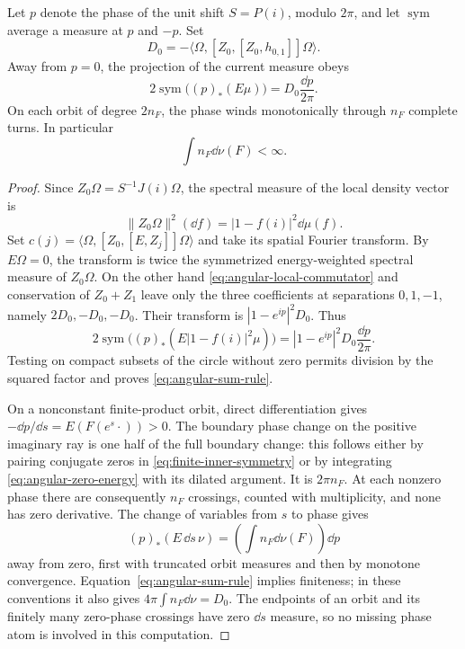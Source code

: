 \begin{lemma}\label{lem:sum-rule}
Let $p$ denote the phase of the unit shift $S=P(i)$, modulo $2\pi$, and
let $\operatorname{sym}$ average a measure at $p$ and $-p$.  Set
\[
 D_0=-\langle\Omega,[Z_0,[Z_0,h_{0,1}]]\Omega\rangle.
\]
Away from $p=0$, the projection of the current measure obeys
\begin{equation}\label{eq:angular-sum-rule}
 2\operatorname{sym}\bigl((p)_*(E\mu)\bigr)
       =D_0\frac{\dd p}{2\pi}.
\end{equation}
On each orbit of degree $2n_F$, the phase winds monotonically through
$n_F$ complete turns.  In particular
\begin{equation}\label{eq:angular-degree-integral}
 \int n_F\dd\nu(F)<\infty.
\end{equation}
\end{lemma}

\begin{proof}
Since $Z_0\Omega=S^{-1}J(i)\Omega$, the spectral measure of the local
density vector is
\begin{equation}\label{eq:angular-density-measure}
 \|Z_0\Omega\|^2(\dd f)=|1-f(i)|^2\dd\mu(f).
\end{equation}
Set $c(j)=\langle\Omega,[Z_0,[E,Z_j]]\Omega\rangle$ and take its
spatial Fourier transform. By $E\Omega=0$, the transform is twice the symmetrized
energy-weighted spectral measure of $Z_0\Omega$.  On the other hand
\eqref{eq:angular-local-commutator} and conservation of
$Z_0+Z_1$ leave only the three coefficients at separations $0,1,-1$,
namely $2D_0,-D_0,-D_0$.  Their transform is
$|1-e^{ip}|^2D_0$.  Thus
\[
 2\operatorname{sym}\bigl((p)_*(E|1-f(i)|^2\mu)\bigr)
 =|1-e^{ip}|^2D_0\frac{\dd p}{2\pi}.
\]
Testing on compact subsets of the circle without zero permits division
by the squared factor and proves \eqref{eq:angular-sum-rule}.

On a nonconstant finite-product orbit, direct differentiation gives
$-\dd p/\dd s=E(F(e^s\cdot))>0$.  The boundary phase change on the
positive imaginary ray is one half of the full boundary change: this
follows either by pairing conjugate zeros in
\eqref{eq:finite-inner-symmetry} or by integrating
\eqref{eq:angular-zero-energy} with its dilated argument.  It is
$2\pi n_F$.  At each nonzero phase there are consequently $n_F$
crossings, counted with multiplicity, and none has zero derivative.
The change of variables from $s$ to phase gives
\[
 (p)_*(E\,\dd s\,\nu)=\left(\int n_F\dd\nu(F)\right)\dd p
\]
away from zero, first with truncated orbit measures and then by monotone
convergence.  Equation~\eqref{eq:angular-sum-rule} implies finiteness;
in these conventions it also gives
$4\pi\int n_F\dd\nu=D_0$.  The endpoints of an orbit and its finitely
many zero-phase crossings have zero $\dd s$ measure, so no missing
phase atom is involved in this computation.
\end{proof}

